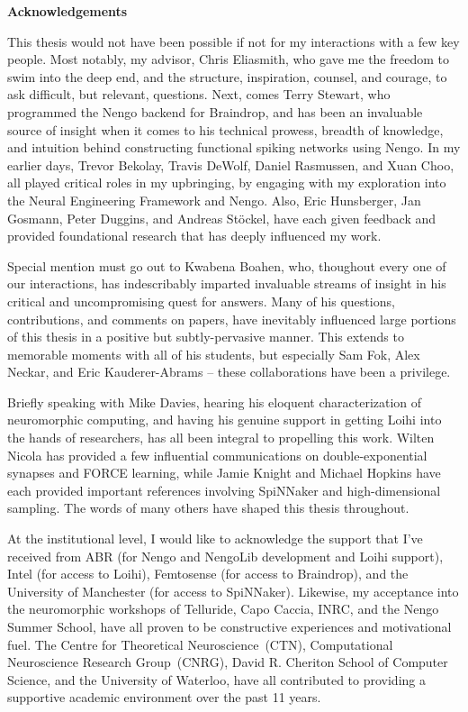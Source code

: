 {}
\begin{center}\textbf{Acknowledgements}\end{center}

This thesis would not have been possible if not for my interactions with a few key people.
Most notably, my advisor, Chris Eliasmith, who gave me the freedom to swim into the deep end, and the structure, inspiration, counsel, and courage, to ask difficult, but relevant, questions.
Next, comes Terry Stewart, who programmed the Nengo backend for Braindrop, and has been an invaluable source of insight when it comes to his technical prowess, breadth of knowledge, and intuition behind constructing functional spiking networks using Nengo.
In my earlier days, Trevor Bekolay, Travis DeWolf, Daniel Rasmussen, and Xuan Choo, all played critical roles in my upbringing, by engaging with my exploration into the Neural Engineering Framework and Nengo.
Also, Eric Hunsberger, Jan Gosmann, Peter Duggins, and Andreas St{\"o}ckel, have each given feedback and provided foundational research that has deeply influenced my work.

Special mention must go out to Kwabena Boahen, who, thoughout every one of our interactions, has indescribably imparted invaluable streams of insight in his critical and uncompromising quest for answers.
Many of his questions, contributions, and comments on papers, have inevitably influenced large portions of this thesis in a positive but subtly-pervasive manner.
This extends to memorable moments with all of his students, but especially Sam Fok, Alex Neckar, and Eric Kauderer-Abrams -- these collaborations have been a privilege.

Briefly speaking with Mike Davies, hearing his eloquent characterization of neuromorphic computing, and having his genuine support in getting Loihi into the hands of researchers, has all been integral to propelling this work.
Wilten Nicola has provided a few influential communications on double-exponential synapses and FORCE learning, while Jamie Knight and Michael Hopkins have each provided important references involving SpiNNaker and high-dimensional sampling.
The words of many others have shaped this thesis throughout.

At the institutional level, I would like to acknowledge the support that I've received from
ABR (for Nengo and NengoLib development and Loihi support),
Intel (for access to Loihi),
Femtosense (for access to Braindrop),
and the University of Manchester (for access to SpiNNaker).
Likewise, my acceptance into the neuromorphic workshops of Telluride, Capo Caccia, INRC, and the Nengo Summer School, have all proven to be constructive experiences and motivational fuel.
The Centre for Theoretical Neuroscience~(CTN), Computational Neuroscience Research Group~(CNRG), David R. Cheriton School of Computer Science, and the University of Waterloo, have all contributed to providing a supportive academic environment over the past 11 years.  

